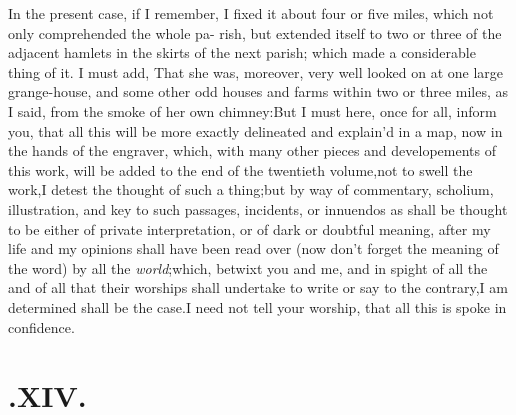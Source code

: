 \documentclass{article}
\begin{document}
In the present case, if I remember, I fixed it about four or
five miles, which not only comprehended the whole pa- rish, but
extended itself to two or three of the adjacent hamlets in the
skirts of the next parish; which made a considerable thing of it. I
must add, That she was, moreover, very well looked on at one large
grange-house, and some other odd houses and farms within two or
three miles, as I said, from the smoke of her own
chimney:\tsh  But I must here, once for all, inform you,
that all this will be more exactly delineated and explain’d
in a map, now in the hands of the engraver, which, with many other
pieces and developements of this work, will be added to the end of
the twentieth volume,\tsk  not to swell the work,\tsk  I detest
the thought of such a thing;\tsk  but by way of commentary,
scholium, illustration, and key to such passages, incidents, or
innuendos as shall be thought to be either of private
interpretation, or of dark or doubtful meaning, after my life and
my opinions shall have been read over (now don’t forget the
meaning of the word) by all the \textit{world};\tsh  which,
betwixt you and me, and in spight of all the\break 
{} and of all that their worships shall
under\-take to write or say to the contrary,\tsh\break  I am determined
shall be the case.\tsk  I need not tell your worship, that all
this is spoke in confidence.

\section{.\enspace XIV.}
\end{document}
